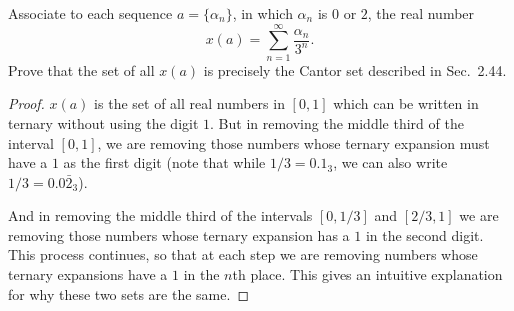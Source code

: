  Associate to each sequence $a = \{\alpha_n\}$, in which
$\alpha_n$ is $0$ or $2$, the real number
\begin{equation*}
  x(a) = \sum_{n=1}^\infty\frac{\alpha_n}{3^n}.
\end{equation*}
Prove that the set of all $x(a)$ is precisely the Cantor set described
in Sec.~2.44.
\begin{proof}
  $x(a)$ is the set of all real numbers in $[0,1]$ which can be
  written in ternary without using the digit $1$. But in removing the
  middle third of the interval $[0,1]$, we are removing those numbers
  whose ternary expansion must have a $1$ as the first digit (note
  that while $1/3 = 0.1_3$, we can also write $1/3 = 0.0\bar2_3$).

  And in removing the middle third of the intervals $[0,1/3]$ and
  $[2/3,1]$ we are removing those numbers whose ternary expansion has
  a $1$ in the second digit. This process continues, so that at each
  step we are removing numbers whose ternary expansions have a $1$ in
  the $n$th place. This gives an intuitive explanation for why these
  two sets are the same.
\end{proof}
